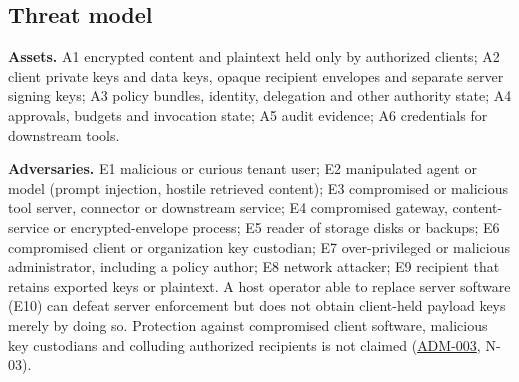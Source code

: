 \documentclass[11pt,a4paper]{article}
\newcommand{\rr}[1]{\hyperlink{req:#1}{#1}}
\begin{document}
\subsection{Threat model}\label{sec:threats}
\textbf{Assets.} A1 encrypted content and plaintext held only by authorized clients; A2 client private keys and data keys, opaque recipient envelopes and separate server signing keys; A3 policy bundles, identity, delegation and other authority state; A4 approvals, budgets and invocation state; A5 audit evidence; A6 credentials for downstream tools.

\textbf{Adversaries.} E1 malicious or curious tenant user; E2 manipulated agent or model (prompt injection, hostile retrieved content); E3 compromised or malicious tool server, connector or downstream service; E4 compromised gateway, content-service or encrypted-envelope process; E5 reader of storage disks or backups; E6 compromised client or organization key custodian; E7 over-privileged or malicious administrator, including a policy author; E8 network attacker; E9 recipient that retains exported keys or plaintext. A host operator able to replace server software (E10) can defeat server enforcement but does not obtain client-held payload keys merely by doing so. Protection against compromised client software, malicious key custodians and colluding authorized recipients is not claimed (\rr{ADM-003}, N-03).
\end{document}
